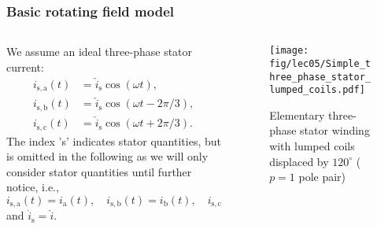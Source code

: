 \begin{frame}
	\frametitle{Basic rotating field model}
    \begin{columns}
		\begin{column}{0.55\textwidth}
	        We assume an ideal three-phase stator current:
            \begin{equation}
                \begin{split}
                    i_\mathrm{s,a}(t) &= \hat{i}_{\mathrm{s}} \cos(\omega t), \\
                    i_\mathrm{s,b}(t) &= \hat{i}_{\mathrm{s}} \cos(\omega t - 2\pi/3), \\
                    i_\mathrm{s,c}(t) &= \hat{i}_{\mathrm{s}} \cos(\omega t + 2\pi/3).
                \end{split}
            \end{equation}
            The index 's' indicates stator quantities, but is omitted in the following as we will only consider stator quantities until further notice, i.e., 
            $$i_\mathrm{s,a}(t) = i_\mathrm{a}(t), \quad i_\mathrm{s,b}(t) = i_\mathrm{b}(t), \quad i_\mathrm{s,c}(t) = i_\mathrm{c}(t)$$
            and $\hat{i}_{\mathrm{s}}=\hat{i}$. 
        \end{column}
        \begin{column}{0.45\textwidth}
            \begin{figure}
                \centering
                \texttt{[image: fig/lec05/Simple\_three\_phase\_stator\_lumped\_coils.pdf]}
                \caption{Elementary three-phase stator winding with lumped coils  displaced by $120^\circ$ ($p=1$ pole pair)}
                \label{fig:Simple_three_phase_stator_lumped_coils}
            \end{figure}
        \end{column}
    \end{columns}
\end{frame}

